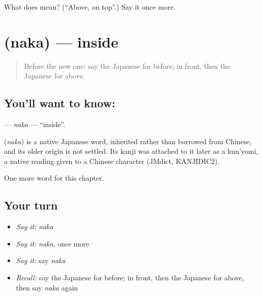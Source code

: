 \begin{tcolorbox}[breakable,colback=teal!4,colframe=teal!35!black,title={Before you move on}]
What does  mean? (\textquotedblleft{}Above, on top\textquotedblright{}.) Say it once more.
\end{tcolorbox}
\section[\texorpdfstring{\ja{なか} (naka)}{なか (naka)}]{ (naka) — inside}

\label{lesson:JA-C56-naka}



\begin{quote}
Before the new one: say the Japanese for before; in front, then the Japanese for above.
\end{quote}

\subsection*{You'll want to know: }
\textbf{} — \emph{naka} — \textquotedblleft{}inside\textquotedblright{}.

\begin{cousinweb}
\textbf{} (\emph{naka}) is a native Japanese word, inherited rather than borrowed from Chinese, and its older origin is not settled. Its kanji was attached to it later as a kun'yomi, a native reading given to a Chinese character (JMdict, KANJIDIC2).
\end{cousinweb}

\begin{grammarlens}[title={What you've built}]
One more word for this chapter.
\end{grammarlens}

\subsection*{Your turn}
\begin{itemize}
\raggedright
  \item \emph{Say it:} \emph{naka}
  \item \emph{Say it:} \emph{naka}, once more
  \item \emph{Say it:} say \emph{naka}
  \item \emph{Recall:} say the Japanese for before; in front, then the Japanese for above, then say \emph{naka} again
\end{itemize}

